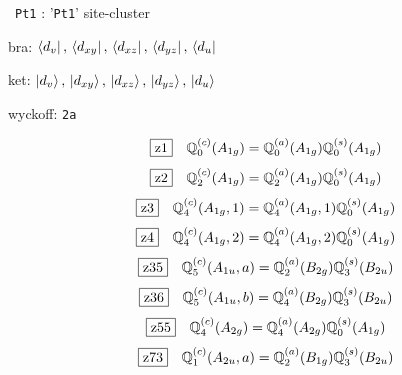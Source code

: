 \documentclass[fleqn,10pt,landscape]{jsarticle}
\begin{document}
\vspace{5mm}

\noindent\textbullet\, \texttt{Pt1} : '\texttt{Pt1}' site-cluster

\noindent\quad * bra: $\bra{d_{v}},\, \bra{d_{xy}},\, \bra{d_{xz}},\, \bra{d_{yz}},\, \bra{d_{u}}$

\noindent\quad * ket: $\ket{d_{v}},\, \ket{d_{xy}},\, \ket{d_{xz}},\, \ket{d_{yz}},\, \ket{d_{u}}$

\noindent\quad * wyckoff: \texttt{2a}

\begin{dmath*}
\hspace*{3mm}\fbox{z1}\quad \mathbb{Q}_{0}^{(c)}(A_{1g})=\mathbb{Q}_{0}^{(a)}(A_{1g}) \mathbb{Q}_{0}^{(s)}(A_{1g})
\end{dmath*}
\begin{dmath*}
\hspace*{3mm}\fbox{z2}\quad \mathbb{Q}_{2}^{(c)}(A_{1g})=\mathbb{Q}_{2}^{(a)}(A_{1g}) \mathbb{Q}_{0}^{(s)}(A_{1g})
\end{dmath*}
\begin{dmath*}
\hspace*{3mm}\fbox{z3}\quad \mathbb{Q}_{4}^{(c)}(A_{1g},1)=\mathbb{Q}_{4}^{(a)}(A_{1g},1) \mathbb{Q}_{0}^{(s)}(A_{1g})
\end{dmath*}
\begin{dmath*}
\hspace*{3mm}\fbox{z4}\quad \mathbb{Q}_{4}^{(c)}(A_{1g},2)=\mathbb{Q}_{4}^{(a)}(A_{1g},2) \mathbb{Q}_{0}^{(s)}(A_{1g})
\end{dmath*}
\begin{dmath*}
\hspace*{3mm}\fbox{z35}\quad \mathbb{Q}_{5}^{(c)}(A_{1u},a)=\mathbb{Q}_{2}^{(a)}(B_{2g}) \mathbb{Q}_{3}^{(s)}(B_{2u})
\end{dmath*}
\begin{dmath*}
\hspace*{3mm}\fbox{z36}\quad \mathbb{Q}_{5}^{(c)}(A_{1u},b)=\mathbb{Q}_{4}^{(a)}(B_{2g}) \mathbb{Q}_{3}^{(s)}(B_{2u})
\end{dmath*}
\begin{dmath*}
\hspace*{3mm}\fbox{z55}\quad \mathbb{Q}_{4}^{(c)}(A_{2g})=\mathbb{Q}_{4}^{(a)}(A_{2g}) \mathbb{Q}_{0}^{(s)}(A_{1g})
\end{dmath*}
\begin{dmath*}
\hspace*{3mm}\fbox{z73}\quad \mathbb{Q}_{1}^{(c)}(A_{2u},a)=\mathbb{Q}_{2}^{(a)}(B_{1g}) \mathbb{Q}_{3}^{(s)}(B_{2u})
\end{dmath*}
\end{document}

